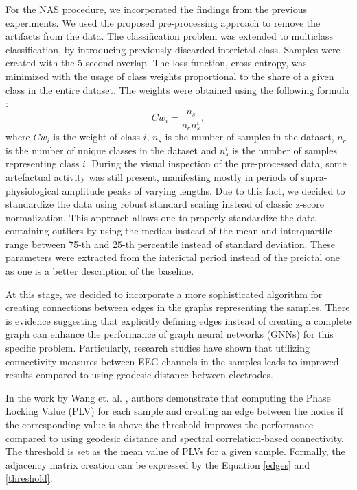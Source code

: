 \documentclass[a4paper,fleqn]{cas-sc}
\begin{document}
For the NAS procedure, we incorporated the findings from the previous experiments. We used the proposed pre-processing approach to remove the artifacts from the data. The classification problem was extended to multiclass classification, by introducing previously discarded interictal class. Samples were created with the 5-second overlap. The loss function, cross-entropy, was minimized with the usage of class weights proportional to the share of a given class in the entire dataset. The weights were obtained using the following formula \cite{king2001regression}:
\begin{equation}
    Cw_{i} = \frac{n_{s}}{n_{c}n_{s}^{i}},
\end{equation}
where $Cw_{i}$ is the weight of class $i$, $n_{s}$ is the number of samples in the dataset, $n_{c}$ is the number of unique classes in the dataset and $n_{s}^{i}$ is the number of samples representing class $i$.
During the visual inspection of the pre-processed data, some artefactual activity was still present, manifesting mostly in periods of supra-physiological amplitude peaks of varying lengths. Due to this fact, we decided to standardize the data using robust standard scaling instead of classic z-score normalization. This approach allows one to properly standardize the data containing outliers by using the median instead of the mean and interquartile range between 75-th and 25-th percentile instead of standard deviation. These parameters were extracted from the interictal period instead of the preictal one as one is a better description of the baseline.

At this stage, we decided to incorporate a more sophisticated algorithm for creating connections between edges in the graphs representing the samples. There is evidence suggesting that explicitly defining edges instead of creating a complete graph can enhance the performance of graph neural networks (GNNs) for this specific problem. Particularly, research studies have shown that utilizing connectivity measures between EEG channels in the samples leads to improved results compared to using geodesic distance between electrodes.

In the work by Wang et. al. \cite{wang2023plvgraphs}, authors demonstrate that computing the Phase Locking Value (PLV) \cite{bruna2018plv} for each sample and creating an edge between the nodes if the corresponding value is above the threshold improves the performance compared to using geodesic distance and spectral correlation-based connectivity. The threshold is set as the mean value of PLVs for a given sample. Formally, the adjacency matrix creation can be expressed by the Equation \ref{edges} and \ref{threshold}.
\end{document}

